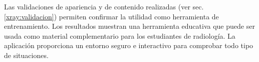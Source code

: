 Las validaciones de apariencia y de contenido realizadas (ver sec. \ref{xray:validacion}) permiten confirmar la utilidad como herramienta de entrenamiento. Los resultados muestran una herramienta educativa que puede ser usada como material complementario para los estudiantes de radiología. La aplicación proporciona un entorno seguro e interactivo para comprobar todo tipo de situaciones.








